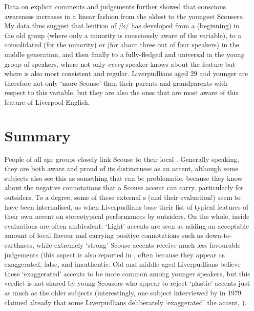 Data on explicit comments and judgements further showed that conscious awareness increases in a linear fashion from the oldest to the youngest Scousers.
My data thus suggest that lenition of /k/ has developed from a (beginning)  in the old group (where only a minority is consciously aware of the variable), to a consolidated  (for the minority) or  (for about three out of four speakers) in the middle generation, and then finally to a fully-fledged and universal  in the young group of speakers, where not only \emph{every} speaker knows about the feature but where  is also most consistent and regular.
Liverpudlians aged 29 and younger are therefore not only `more Scouse' than their parents and grandparents with respect to this variable, but they are also the ones that are most aware of this feature of Liverpool English.

\section{Summary}
\label{prod.disc.summary}

People of all age groups closely link Scouse to their local .
Generally speaking, they are both aware and proud of its distinctness as an accent, although some subjects also see this as something that can be problematic, because they know about the negative connotations that a Scouse accent can carry, particularly for outsiders.
To a degree, some of these external s (and their evaluation!) seem to have been internalised, as when Liverpudlians base their list of typical features of their own accent on stereotypical performances by outsiders.
On the whole, inside evaluations are often ambivalent: `Light' accents are seen as adding an acceptable amount of local flavour and carrying positive connotations such as down-to-earthness, while extremely `strong' Scouse accents receive much less favourable judgements (this aspect is also reported in \citealt[33]{delyon1981}, often because they appear as exaggerated, false, and inauthentic.
Old and middle-aged Liverpudlians believe these `exaggerated' accents to be more common among younger speakers, but this verdict is not shared by young Scousers who appear to reject `plastic' accents just as much as the older subjects (interestingly, one subject interviewed by \citeauthor{delyon1981} in 1979 claimed already that some Liverpudlians deliberately `exaggerated' the accent, \citealt[cf.][30]{delyon1981}).

